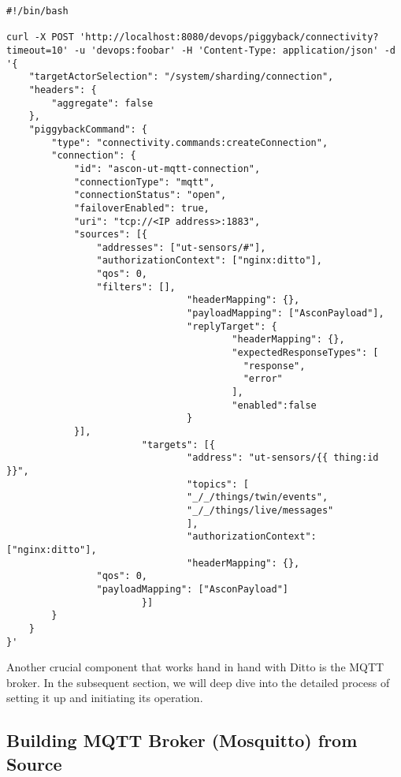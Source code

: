 \begin{lstlisting}[style=CStyle, caption={A Bash Script to Create Connection in Ditto}]
#!/bin/bash

curl -X POST 'http://localhost:8080/devops/piggyback/connectivity?timeout=10' -u 'devops:foobar' -H 'Content-Type: application/json' -d '{
    "targetActorSelection": "/system/sharding/connection",
    "headers": {
        "aggregate": false
    },
    "piggybackCommand": {
        "type": "connectivity.commands:createConnection",
        "connection": {
            "id": "ascon-ut-mqtt-connection",
            "connectionType": "mqtt",
            "connectionStatus": "open",
            "failoverEnabled": true,
            "uri": "tcp://<IP address>:1883",
            "sources": [{
                "addresses": ["ut-sensors/#"],
                "authorizationContext": ["nginx:ditto"],
                "qos": 0,
                "filters": [],
                                "headerMapping": {},
                                "payloadMapping": ["AsconPayload"],
                                "replyTarget": {
                                        "headerMapping": {},
                                        "expectedResponseTypes": [
                                          "response",
                                          "error"
                                        ],
                                        "enabled":false
                                }
            }],
                        "targets": [{
                                "address": "ut-sensors/{{ thing:id }}",
                                "topics": [
                                "_/_/things/twin/events",
                                "_/_/things/live/messages"
                                ],
                                "authorizationContext": ["nginx:ditto"],
                                "headerMapping": {},
                "qos": 0,
                "payloadMapping": ["AsconPayload"]
                        }]
        }
    }
}'
\end{lstlisting}


Another crucial component that works hand in hand with Ditto is the MQTT broker. In the subsequent section, we will deep dive into the detailed process of setting it up and initiating its operation.

\subsection{Building MQTT Broker (Mosquitto) from Source}

